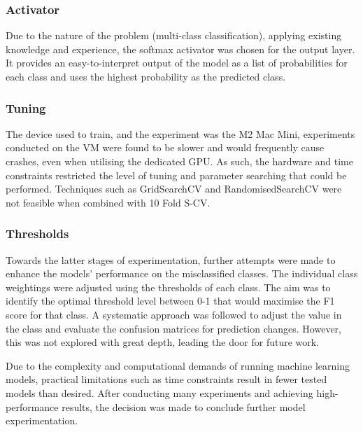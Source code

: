  
\subsubsection*{Activator}
Due to the nature of the problem (multi-class classification), applying existing knowledge and experience, the softmax activator was chosen for the output layer. It provides an easy-to-interpret output of the model as a list of probabilities for each class and uses the highest probability as the predicted class. 

\subsubsection*{Tuning}

The device used to train, and the experiment was the M2 Mac Mini, experiments conducted on the VM were found to be slower and would frequently cause crashes, even when utilising the dedicated GPU. As such, the hardware and time constraints restricted the level of tuning and parameter searching that could be performed. Techniques such as GridSearchCV and RandomisedSearchCV were not feasible when combined with 10 Fold S-CV. 

\subsubsection*{Thresholds}
Towards the latter stages of experimentation, further attempts were made to enhance the models' performance on the misclassified classes. The individual class weightings were adjusted using the thresholds of each class. The aim was to identify the optimal threshold level between 0-1 that would maximise the F1 score for that class. A systematic approach was followed to adjust the value in the class and evaluate the confusion matrices for prediction changes. However, this was not explored with great depth, leading the door for future work.

\medskip
Due to the complexity and computational demands of running machine learning models, practical limitations such as time constraints result in fewer tested models than desired. After conducting many experiments and achieving high-performance results, the decision was made to conclude further model experimentation. 
 
